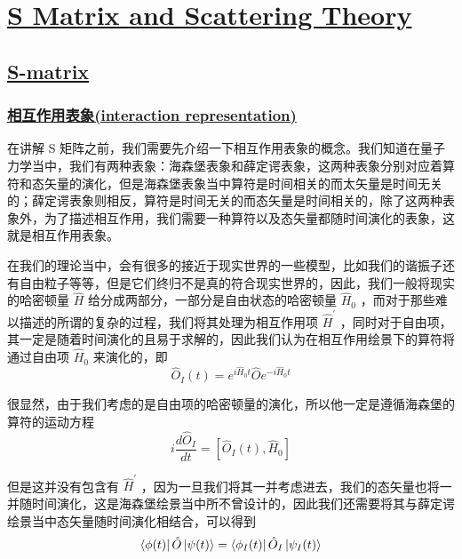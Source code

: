 \chapter{\protect\hyperlink{:}{S Matrix and Scattering Theory}}

\section{\protect\hyperlink{:}{S-matrix}}



\subsection{\protect\hyperlink{:}{相互作用表象(interaction representation)}}

在讲解 S 矩阵之前，我们需要先介绍一下相互作用表象的概念。我们知道在量子力学当中，我们有两种表象：海森堡表象和薛定谔表象，这两种表象分别对应着算符和态矢量的演化，但是海森堡表象当中算符是时间相关的而太矢量是时间无关的；薛定谔表象则相反，算符是时间无关的而态矢量是时间相关的，除了这两种表象外，为了描述相互作用，我们需要一种算符以及态矢量都随时间演化的表象，这就是相互作用表象。

在我们的理论当中，会有很多的接近于现实世界的一些模型，比如我们的谐振子还有自由粒子等等，但是它们终归不是真的符合现实世界的，因此，我们一般将现实的哈密顿量 $\hat{H}$ 给分成两部分，一部分是自由状态的哈密顿量 $ \hat{H}_0 $ ，而对于那些难以描述的所谓的复杂的过程，我们将其处理为相互作用项 $ \hat{H}^\prime $ ，同时对于自由项，其一定是随着时间演化的且易于求解的，因此我们认为在相互作用绘景下的算符将通过自由项 $ \hat{H}_0 $ 来演化的，即
\begin{equation}
    \hat{O}_I(t) = e^{i\hat{H}_0 t}\hat{O}e^{-i\hat{H}_0 t}
\end{equation} 

很显然，由于我们考虑的是自由项的哈密顿量的演化，所以他一定是遵循海森堡的算符的运动方程
\begin{equation}
    i \frac{d\hat{O}_I}{dt} = \left[\hat{O}_I(t) ,\hat{H}_0\right]
\end{equation}

但是这并没有包含有 $ \hat{H}^\prime $ ，因为一旦我们将其一并考虑进去，我们的态矢量也将一并随时间演化，这是海森堡绘景当中所不曾设计的，因此我们还需要将其与薛定谔绘景当中态矢量随时间演化相结合，可以得到
\begin{equation}
    \bra{\phi(t)}\hat{O}\ket{\psi(t)} = \bra{\phi_I(t)}\hat{O}_I\ket{\psi_I(t)}
\end{equation}

